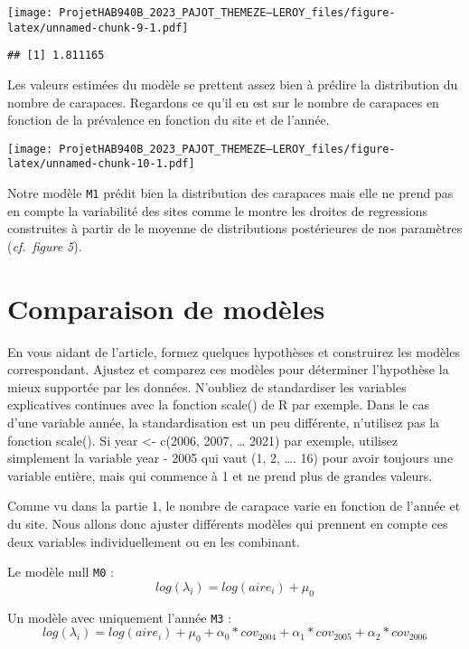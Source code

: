 \documentclass[
]{article}
\begin{document}
\texttt{[image: ProjetHAB940B\_2023\_PAJOT\_THEMEZE--LEROY\_files/figure-latex/unnamed-chunk-9-1.pdf]}

\begin{verbatim}
## [1] 1.811165
\end{verbatim}

Les valeurs estimées du modèle se prettent assez bien à prédire la
distribution du nombre de carapaces. Regardons ce qu'il en est sur le
nombre de carapaces en fonction de la prévalence en fonction du site et
de l'année.

\texttt{[image: ProjetHAB940B\_2023\_PAJOT\_THEMEZE--LEROY\_files/figure-latex/unnamed-chunk-10-1.pdf]}

Notre modèle \texttt{M1} prédit bien la distribution des carapaces mais
elle ne prend pas en compte la variabilité des sites comme le montre les
droites de regressions construites à partir de le moyenne de
distributions postérieures de nos paramètres (\emph{cf.~figure 5}).

\hypertarget{comparaison-de-moduxe8les}{%
\section{\texorpdfstring{\textbf{Comparaison de
modèles}}{Comparaison de modèles}}\label{comparaison-de-moduxe8les}}

En vous aidant de l'article, formez quelques hypothèses et construirez
les modèles correspondant. Ajustez et comparez ces modèles pour
déterminer l'hypothèse la mieux supportée par les données. N'oubliez de
standardiser les variables explicatives continues avec la fonction
scale() de R par exemple. Dans le cas d'une variable année, la
standardisation est un peu différente, n'utilisez pas la fonction
scale(). Si year \textless- c(2006, 2007, \ldots{} 2021) par exemple,
utilisez simplement la variable year - 2005 qui vaut (1, 2, \ldots. 16)
pour avoir toujours une variable entière, mais qui commence à 1 et ne
prend plus de grandes valeurs.

Comme vu dans la partie 1, le nombre de carapace varie en fonction de
l'année et du site. Nous allons donc ajuster différents modèles qui
prennent en compte ces deux variables individuellement ou en les
combinant.

Le modèle null \texttt{M0} :
\[log(\lambda_i) =  log({aire_{i}}) + \mu_0\]

Un modèle avec uniquement l'année \texttt{M3} :
\[log(\lambda_i) =  log({aire_{i}}) + \mu_0 + \alpha_0 * cov_{2004}+\alpha_1 * cov_{2005} +\alpha_2 * cov_{2006}\]
\end{document}
